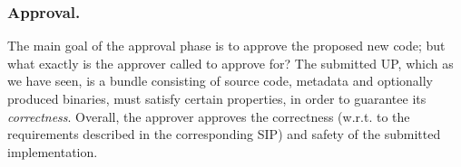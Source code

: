 \subsubsection{Approval.}



The main goal of the approval phase is to approve the proposed new code; but
what exactly is the approver called to approve for? The submitted UP, which as
we have seen, is a bundle consisting of source code, metadata and optionally
produced binaries, must satisfy certain properties, in order to guarantee its
\emph{correctness}. Overall, the approver approves the correctness (w.r.t. to
the requirements described in the corresponding SIP) and safety of the
submitted implementation.



